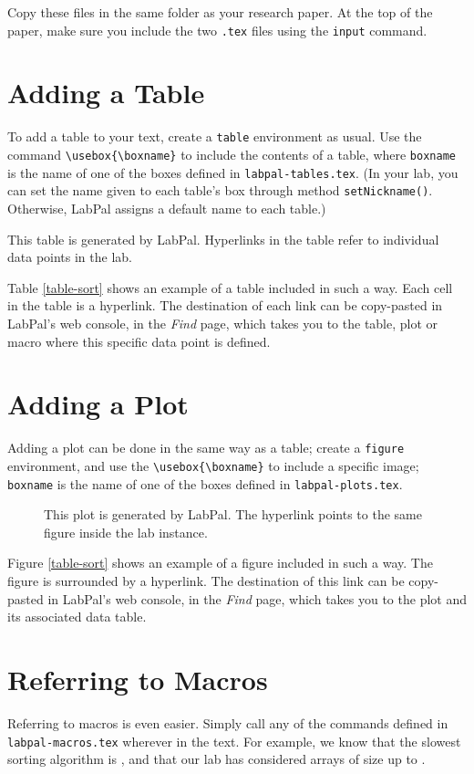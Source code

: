\documentclass[utf8,twocolumn]{article}
\begin{document}
Copy these files in the same folder as your research paper. At the top of the
paper, make sure you include the two \texttt{.tex} files using the
\texttt{input} command.

\section*{Adding a Table}

To add a table to your text, create a \texttt{table} environment as usual. Use
the command \verb+\usebox{\boxname}+ to include the contents of a table, where
\verb+boxname+ is the name of one of the boxes defined in
\verb+labpal-tables.tex+. (In your lab, you can set the name given to each
table's box through method \verb+setNickname()+. Otherwise, LabPal assigns a
default name to each table.)

\begin{table}
\centering
\usebox{\sorttime}
\caption{This table is generated by LabPal. Hyperlinks in the table refer to
individual data points in the lab.}
\label{table-sort}
\end{table}

Table \ref{table-sort} shows an example of a table included in such a way. Each
cell in the table is a hyperlink. The destination of each link can be
copy-pasted in LabPal's web console, in the \textsl{Find} page, which takes you
to the table, plot or macro where this specific data point is defined.

\section*{Adding a Plot}

Adding a plot can be done in the same way as a table; create a \texttt{figure}
environment, and use the \verb+\usebox{\boxname}+ to include a specific image;
\verb+boxname+ is the name of one of the boxes defined in
\verb+labpal-plots.tex+.

\begin{figure}
\centering
\usebox{\sortplot}
\caption{This plot is generated by LabPal. The hyperlink points to the same
figure inside the lab instance.}
\end{figure}

Figure \ref{table-sort} shows an example of a figure included in such a way. The
figure is surrounded by a hyperlink. The destination of this link can be
copy-pasted in LabPal's web console, in the \textsl{Find} page, which takes you
to the plot and its associated data table.

\section*{Referring to Macros}

Referring to macros is even easier. Simply call any of the commands defined in
\verb+labpal-macros.tex+ wherever in the text. For example, we know that the
slowest sorting algorithm is \slowestAlgo{}, and that our lab has considered
arrays of size up to \maxSize{}.
\end{document}
